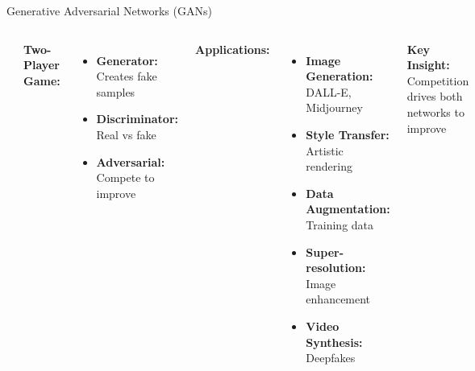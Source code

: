 \documentclass[aspectratio=169]{beamer}
\begin{document}
\begin{frame}{Generative Adversarial Networks (GANs)}
  \begin{columns}
    \begin{center}
      \includegraphics[width=\textwidth]{images/gan.png}
    \end{center}
    
    \textbf{Two-Player Game:}
    \small
    \begin{itemize}
      \item \textbf{Generator:} Creates fake samples
      \item \textbf{Discriminator:} Real vs fake
      \item \textbf{Adversarial:} Compete to improve
    \end{itemize}
    
    \textbf{Applications:}
    \begin{itemize}
      \item \textbf{Image Generation:} DALL-E, Midjourney
      \item \textbf{Style Transfer:} Artistic rendering
      \item \textbf{Data Augmentation:} Training data
      \item \textbf{Super-resolution:} Image enhancement
      \item \textbf{Video Synthesis:} Deepfakes
    \end{itemize}
    
    \vspace{0.2cm}
    \textbf{Key Insight:} Competition drives both networks to improve
  \end{columns}
\end{frame}
\end{document}
